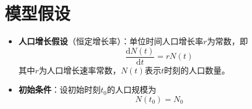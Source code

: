 \section{模型假设}\label{sec:Premise}

\begin{itemize}[leftmargin=2em]
    \item \textbf{人口增长假设}（恒定增长率）：单位时间人口增长率$r$为常数，即
        \begin{equation}
            \frac{\mathrm{d}N(t)}{\mathrm{d}t} = rN(t)
        \end{equation}
        其中$r$为人口增长速率常数，$N(t)$表示$t$时刻的人口数量。
        
    \item \textbf{初始条件}：设初始时刻$t_0$的人口规模为
        \begin{equation}
            N(t_0) = N_0
        \end{equation}
\end{itemize}
